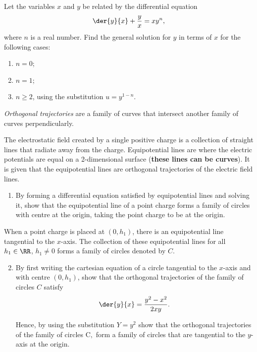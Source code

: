 \begin{problem}
    Let the variables $x$ and $y$ be related by the differential equation \[\der{y}{x} + \frac{y}{x} = xy^n,\] where $n$ is a real number. Find the general solution for $y$ in terms of $x$ for the following cases:
    \begin{enumerate}
        \item $n = 0$;
        \item $n = 1$;
        \item $n \geq 2$, using the substitution $u = y^{1-n}$.
    \end{enumerate}
\end{problem}

\begin{problem}
    \textit{Orthogonal trajectories} are a family of curves that intersect another family of curves perpendicularly.

    The electrostatic field created by a single positive charge is a collection of straight lines that radiate away from the charge. Equipotential lines are where the electric potentials are equal on a 2-dimensional surface (\textbf{these lines can be curves}). It is given that the equipotential lines are orthogonal trajectories of the electric field lines. 

    \begin{enumerate}
        \item By forming a differential equation satisfied by equipotential lines and solving it, show that the equipotential line of a point charge forms a family of circles with centre at the origin, taking the point charge to be at the origin.
    \end{enumerate}

    When a point charge is placed at $(0, h_1)$, there is an equipotential line tangential to the $x$-axis. The collection of these equipotential lines for all $h_1 \in \RR$, $h_1 \neq 0$ forms a family of circles denoted by $C$.

    \begin{enumerate}
        \setcounter{enumi}{1}
        \item By first writing the cartesian equation of a circle tangential to the $x$-axis and with centre $(0, h_1)$, show that the orthogonal trajectories of the family of circles $C$ satisfy \[\der{y}{x} = \frac{y^2 - x^2}{2xy}.\]
        
        Hence, by using the substitution $Y = y^2$ show that the orthogonal trajectories of the family of circles C$,$ form a family of circles that are tangential to the $y$-axis at the origin.
    \end{enumerate}
\end{problem}